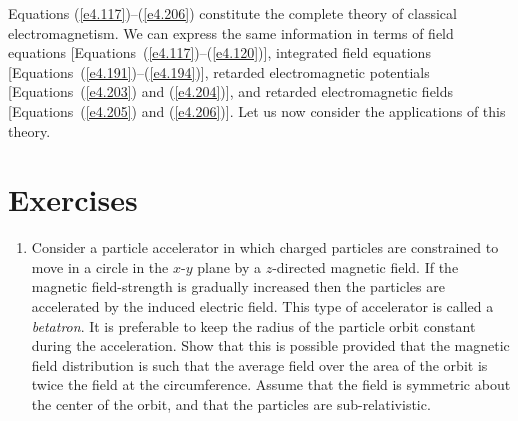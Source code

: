 Equations (\ref{e4.117})--(\ref{e4.206}) constitute the complete theory of classical electromagnetism.
We can express the same information in terms of field equations [Equations~(\ref{e4.117})--(\ref{e4.120})],
integrated field equations [Equations~(\ref{e4.191})--(\ref{e4.194})], retarded electromagnetic
potentials [Equations~(\ref{e4.203}) and (\ref{e4.204})], and retarded electromagnetic
fields [Equations~(\ref{e4.205}) and (\ref{e4.206})]. Let us now consider the applications of this theory.

{\small
\section{Exercises}
\renewcommand{\theenumi}{4.\arabic{enumi}}
\begin{enumerate}
\item Consider a particle accelerator in which charged particles are constrained to move in a circle in the $x$-$y$ plane by a $z$-directed magnetic field. If the magnetic field-strength is gradually increased then the
particles are accelerated by the induced electric field. This type of accelerator
is called a {\em betatron}. It is preferable to keep the radius of the particle
orbit constant during the acceleration. Show that this is possible
provided that the magnetic field distribution is such that the average
field over the area of the  orbit is twice the field at the circumference.
Assume that the field is symmetric about the center of the orbit, and that the
particles are sub-relativistic.


\end{enumerate}}
